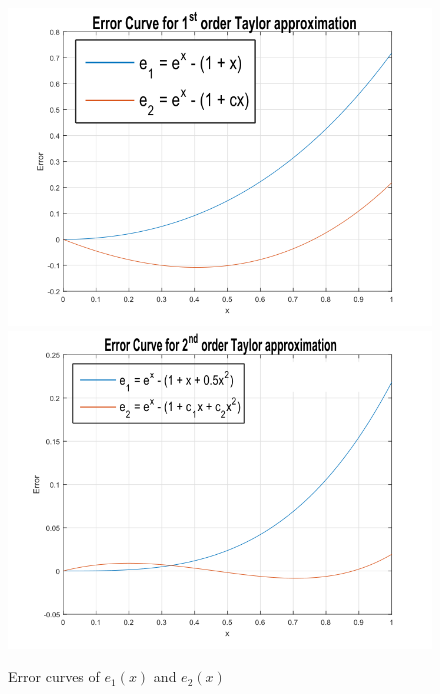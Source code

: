 \documentclass[paper=a4, fontsize=11pt]{scrartcl} %
\numberwithin{equation}{section} %
\numberwithin{figure}{section} %
\numberwithin{table}{section} %
\begin{document}
\begin{figure}[h]
\centering
\includegraphics[width=0.49\linewidth]{q5_b.png}
\includegraphics[width=0.49\linewidth]{q5_c.png}
\caption{Error curves of $ e_1(x) $ and $ e_2(x) $}
\label{fig:Q5}
\end{figure}

\newpage
\end{document}
